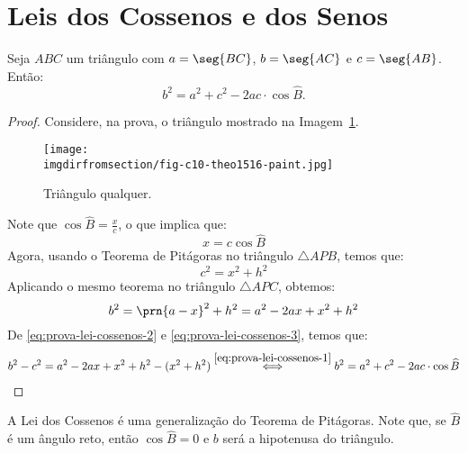 \section{Leis dos Cossenos e dos Senos}

\begin{theorem}
    Seja $ABC$ um triângulo com $a = \seg {BC}$, $b = \seg {AC}$ e $c = \seg
{AB}$. Então:
$$b^2 = a^2 + c^2 - 2 ac \cdot \cos \widehat B.$$
\end{theorem}

\begin{proof}
    Considere, na prova, o triângulo mostrado na Imagem~\ref{img:prova-lei-dos-cossenos}. %
    \begin{figure}[H]
        \centering
        \texttt{[image: \\imgdirfromsection/fig-c10-theo1516-paint.jpg]}
        \caption{Triângulo qualquer.}
        \label{img:prova-lei-dos-cossenos}
    \end{figure}
    Note que $\cos \widehat B = \frac x c$, o que implica que:
    \begin{equation}
    \label{eq:prova-lei-cossenos-1}
        x = c \cos \widehat B
    \end{equation}
    Agora, usando o Teorema de Pitágoras no triângulo $\triangle APB$, temos que:
    \begin{equation}
    \label{eq:prova-lei-cossenos-2}
        c^2 = x^2 + h^2
    \end{equation}
    Aplicando o mesmo teorema no triângulo $\triangle APC$, obtemos:
    \begin{equation}
    \label{eq:prova-lei-cossenos-3}
        b^2 = \prn{a-x}^2+h^2 = a^2 - 2ax+x^2 + h^2
    \end{equation}
    De \ref{eq:prova-lei-cossenos-2} e \ref{eq:prova-lei-cossenos-3}, temos que:
    \begin{align*}
        b^2 - c^2 = a^2 - 2ax + x^2 + h^2    -(x^2 + h^2) \stackrel{\ref{eq:prova-lei-cossenos-1}}{\iff} b^2 = a^2 + c^2 -2ac \cdot \cos \widehat B
    \end{align*}
\end{proof}

\begin{remark}
    A Lei dos Cossenos é uma generalização do Teorema de Pitágoras. Note
que, se $\widehat B$ é um ângulo reto, então $\cos \widehat B = 0$ e
$b$ será a hipotenusa do triângulo.
\end{remark}

